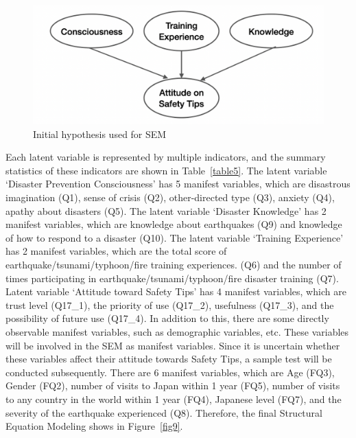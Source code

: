 \begin{figure}[h]
  \includegraphics[width=0.5\linewidth]{Figure/Figure30.jpg}
  \centering
  \caption{Initial hypothesis used for SEM}
  \label{fig30}
\end{figure}

Each latent variable is represented by multiple indicators, and the summary statistics of these indicators are shown in Table~\ref{table5}. The latent variable ‘Disaster Prevention Consciousness' has 5 manifest variables, which are disastrous imagination (Q1), sense of crisis (Q2), other-directed type (Q3), anxiety (Q4), apathy about disasters (Q5). The latent variable ‘Disaster Knowledge' has 2 manifest variables, which are knowledge about earthquakes (Q9) and knowledge of how to respond to a disaster (Q10). The latent variable ‘Training Experience' has 2 manifest variables, which are the total score of earthquake/tsunami/typhoon/fire training experiences. (Q6) and the number of times participating in earthquake/tsunami/typhoon/fire disaster training (Q7). Latent variable ‘Attitude toward Safety Tips' has 4 manifest variables, which are trust level (Q17\_1), the priority of use (Q17\_2), usefulness (Q17\_3), and the possibility of future use (Q17\_4). In addition to this, there are some directly observable manifest variables, such as demographic variables, etc. These variables will be involved in the SEM as manifest variables. Since it is uncertain whether these variables affect their attitude towards Safety Tips, a sample test will be conducted subsequently. There are 6 manifest variables, which are Age (FQ3), Gender (FQ2), number of visits to Japan within 1 year (FQ5), number of visits to any country in the world within 1 year (FQ4), Japanese level (FQ7), and the severity of the earthquake experienced (Q8). Therefore, the final Structural Equation Modeling shows in Figure~\ref{fig9}.
